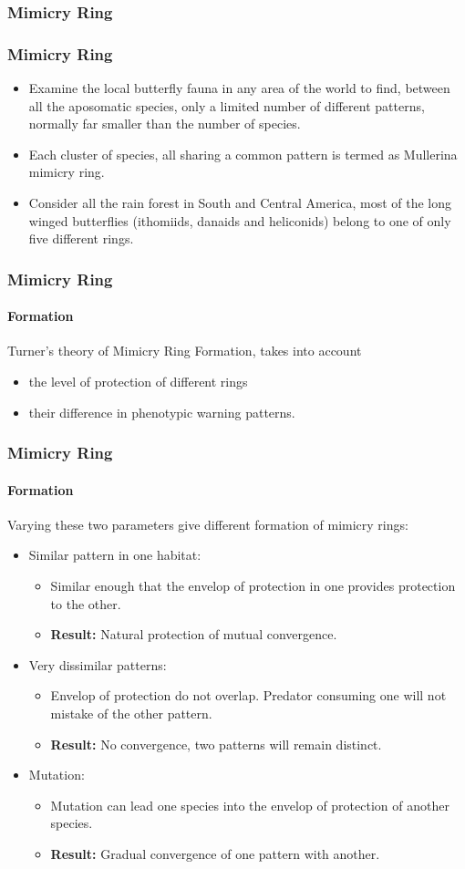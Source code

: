 \subsubsection{Mimicry Ring}

\frame
{
	\frametitle{Mimicry Ring}
	
	\begin{itemize}
		\item Examine the local butterfly fauna in any area of the world to find, between all the aposomatic species, only a limited number of different patterns, normally far smaller than the number of species.
		\item Each cluster of species, all sharing a common pattern is termed as Mullerina mimicry ring.
		\item Consider all the rain forest in South and Central America, most of the long winged butterflies (ithomiids, danaids and heliconids) belong to one of only five different rings.
	\end{itemize}	
}

\frame
{
	\frametitle{Mimicry Ring}
	\framesubtitle{Formation}
	
	Turner's theory of Mimicry Ring Formation, takes into account
	\begin{itemize}
		\item the level of protection of different rings
		\item their difference in phenotypic warning patterns.
	\end{itemize}
	
}

\frame
{
	\frametitle{Mimicry Ring}
	\framesubtitle{Formation}

	Varying these two parameters give different formation of mimicry rings:
	\begin{itemize}
		\item Similar pattern in one habitat:
			\begin{itemize}
				\item Similar enough that the envelop of protection in one provides protection to the other.
				\item \textbf{Result:} Natural protection of mutual convergence.
			\end{itemize}
		\item Very dissimilar patterns:
			\begin{itemize}
				\item Envelop of protection do not overlap. Predator consuming one will not mistake of the other pattern.
				\item \textbf{Result:} No convergence, two patterns will remain distinct.
			\end{itemize}
		\item Mutation:
			\begin{itemize}
				\item Mutation can lead one species into the envelop of protection of another species. 
				\item \textbf{Result:} Gradual convergence of one pattern with another.
			\end{itemize}
	\end{itemize}
}